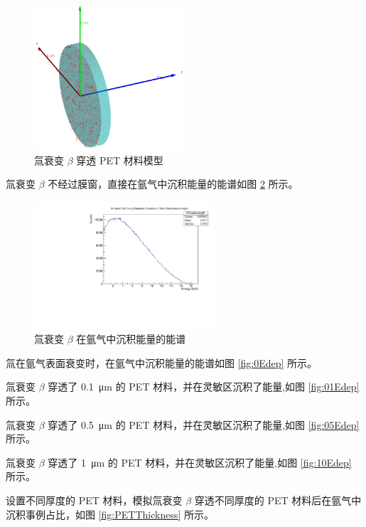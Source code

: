 \begin{figure}[htbp]
	\centering
	\includegraphics[width=0.5\textwidth]{figures/TritiumBetaPenetratePET.png}
	\caption{氚衰变 $\beta$ 穿透 PET 材料模型}
	\label{fig:TritiumBetaPenetratePET}
\end{figure}

氚衰变 $\beta$ 不经过膜窗，直接在氩气中沉积能量的能谱如图 \ref{fig:FullEdep} 所示。

\begin{figure}[htbp]
	\centering
	\includegraphics[width=0.6\textwidth]{figures/FullEdep.pdf}
	\caption{氚衰变 $\beta$ 在氩气中沉积能量的能谱}
	\label{fig:FullEdep}
\end{figure}

氚在氩气表面衰变时，在氩气中沉积能量的能谱如图 \ref{fig:0Edep} 所示。

氚衰变 $\beta$ 穿透了 \SI{0.1}{\micro\meter} 的 PET 材料，并在灵敏区沉积了能量,如图 \ref{fig:01Edep} 所示。

氚衰变 $\beta$ 穿透了 \SI{0.5}{\micro\meter} 的 PET 材料，并在灵敏区沉积了能量,如图 \ref{fig:05Edep} 所示。

氚衰变 $\beta$ 穿透了 \SI{1}{\micro\meter} 的 PET 材料，并在灵敏区沉积了能量,如图 \ref{fig:10Edep} 所示。

设置不同厚度的 PET 材料，模拟氚衰变 $\beta$ 穿透不同厚度的 PET 材料后在氩气中沉积事例占比，如图 \ref{fig:PETThickness} 所示。

